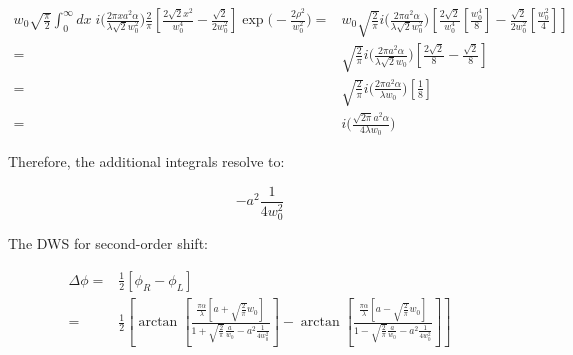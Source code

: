 \documentclass[aps,twoside,secnumarabic,balancelastpage,amsmath,amssymb,nofootinbib,hyperref=pdftex]{revtex4}
\begin{document}
\begin{align*}
w_0 \sqrt{ \frac{\pi}{2} }   \int_{0}^{\infty} dx \;
            			i  
				\big( \frac{2 \pi x a^2 \alpha}{ \lambda \sqrt{2} w_0^2} \big)
                \frac{2}{\pi}
                \left[
                    \frac{2 \sqrt{2} x^2}{w_0^4}
                    -
                    \frac{\sqrt{2}}{2 w_0^2}
                \right]
                \exp \big( - \frac{2 \rho^2}{w_0^2} \big)
                =&
    w_0 \sqrt{ \frac{2}{\pi} } 
            			i  
				\big( \frac{2 \pi  a^2 \alpha}{ \lambda \sqrt{2} w_0^2} \big)
                \left[
                    \frac{2 \sqrt{2}}{w_0^4}
                    [\frac{w_0^4}{8}]
                    -
                    \frac{\sqrt{2}}{2 w_0^2}                 
                    [\frac{w_0^2}{4}]
                \right]
                               \\ =&
     \sqrt{ \frac{2}{\pi} } 
            			i  
				\big( \frac{2 \pi  a^2 \alpha}{ \lambda \sqrt{2} w_0} \big)
                \left[
                    \frac{2 \sqrt{2}}{8}
                    -
                    \frac{\sqrt{2}}{8}
                \right]
                                               \\ =&
     \sqrt{ \frac{2}{\pi} } 
            			i  
				\big( \frac{2 \pi  a^2 \alpha}{ \lambda  w_0} \big)
                \left[
                    \frac{1}{8}
                \right]
                                                               \\ =&
            			i  
				\big( \frac{\sqrt{2 \pi}  a^2 \alpha}{ 4\lambda  w_0} \big)
\end{align*}

Therefore, the additional integrals resolve to:

\begin{equation*}
				-
				a^2 \frac{1}{4 w_0^2}
\end{equation*}

The DWS for second-order shift:

\begin{align*}
	\Delta \phi = &
		 \frac{1}{2} 
		 \left[
		 	\phi_R - \phi_L
		 \right]
		 \\ = &
		 \frac{1}{2}
		 \left[
							\arctan
				\left[
					\frac
					{ \frac{\pi \alpha}{\lambda}
					\left[
						a 
						+
						\sqrt{\frac{2}{\pi}} w_0
					\right]			
					}					
				{1
				+
				 \sqrt{\frac{2}{\pi}} \frac{a}{w_0}
				 		-
				a^2 \frac{1}{4 w_0^2}
				 }
				\right]
		-
						\arctan
				\left[
					\frac
					{ \frac{\pi \alpha}{\lambda}
					\left[
						a 
						-
						\sqrt{\frac{2}{\pi}} w_0
					\right]				
					}					
				{1
				-
				 \sqrt{\frac{2}{\pi}} \frac{a}{w_0}
				 		-
				a^2 \frac{1}{4 w_0^2}
				 }
				\right]
			\right]							 	
\end{align*}
\end{document}
